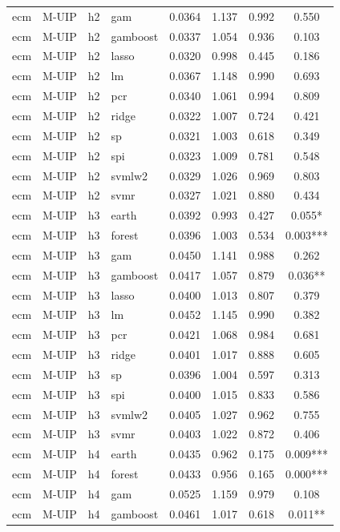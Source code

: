 \begin{ThreePartTable}
\begin{longtable}[t]{llclcccc}
ecm & M-UIP & h2 & gam & 0.0364 & 1.137 & 0.992 & 0.550\\
ecm & M-UIP & h2 & gamboost & 0.0337 & 1.054 & 0.936 & 0.103\\
ecm & M-UIP & h2 & lasso & 0.0320 & 0.998 & 0.445 & 0.186\\
ecm & M-UIP & h2 & lm & 0.0367 & 1.148 & 0.990 & 0.693\\
ecm & M-UIP & h2 & pcr & 0.0340 & 1.061 & 0.994 & 0.809\\
ecm & M-UIP & h2 & ridge & 0.0322 & 1.007 & 0.724 & 0.421\\
ecm & M-UIP & h2 & sp & 0.0321 & 1.003 & 0.618 & 0.349\\
ecm & M-UIP & h2 & spi & 0.0323 & 1.009 & 0.781 & 0.548\\
ecm & M-UIP & h2 & svmlw2 & 0.0329 & 1.026 & 0.969 & 0.803\\
ecm & M-UIP & h2 & svmr & 0.0327 & 1.021 & 0.880 & 0.434\\
\addlinespace
ecm & M-UIP & h3 & earth & 0.0392 & 0.993 & 0.427 & 0.055*\\
ecm & M-UIP & h3 & forest & 0.0396 & 1.003 & 0.534 & 0.003***\\
ecm & M-UIP & h3 & gam & 0.0450 & 1.141 & 0.988 & 0.262\\
ecm & M-UIP & h3 & gamboost & 0.0417 & 1.057 & 0.879 & 0.036**\\
ecm & M-UIP & h3 & lasso & 0.0400 & 1.013 & 0.807 & 0.379\\
ecm & M-UIP & h3 & lm & 0.0452 & 1.145 & 0.990 & 0.382\\
ecm & M-UIP & h3 & pcr & 0.0421 & 1.068 & 0.984 & 0.681\\
ecm & M-UIP & h3 & ridge & 0.0401 & 1.017 & 0.888 & 0.605\\
ecm & M-UIP & h3 & sp & 0.0396 & 1.004 & 0.597 & 0.313\\
ecm & M-UIP & h3 & spi & 0.0400 & 1.015 & 0.833 & 0.586\\
ecm & M-UIP & h3 & svmlw2 & 0.0405 & 1.027 & 0.962 & 0.755\\
ecm & M-UIP & h3 & svmr & 0.0403 & 1.022 & 0.872 & 0.406\\
\addlinespace
ecm & M-UIP & h4 & earth & 0.0435 & 0.962 & 0.175 & 0.009***\\
ecm & M-UIP & h4 & forest & 0.0433 & 0.956 & 0.165 & 0.000***\\
ecm & M-UIP & h4 & gam & 0.0525 & 1.159 & 0.979 & 0.108\\
ecm & M-UIP & h4 & gamboost & 0.0461 & 1.017 & 0.618 & 0.011**\\

\end{longtable}
\end{ThreePartTable}
